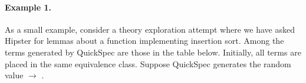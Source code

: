 
\paragraph*{Example 1.}
\label{example1}
As a small example, consider a theory exploration attempt where we have asked Hipster for lemmas about a function  implementing insertion sort.
%
%
Among the terms generated by QuickSpec are those in the table below.
%
Initially, all terms are placed in the same equivalence class.
%
Suppose QuickSpec generates the random value  $\rightarrow$ \isaCode{[3,1]}.     


